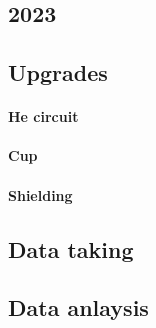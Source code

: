 \begin{refsection}
\section{2023}
\subsection{Upgrades}
\paragraph{He circuit}
\paragraph{Cup}
\paragraph{Shielding}
\subsection{Data taking}
\subsection{Data anlaysis}

\printbibliography[title=Bibliography on \ce{LH2}]
\end{refsection}
